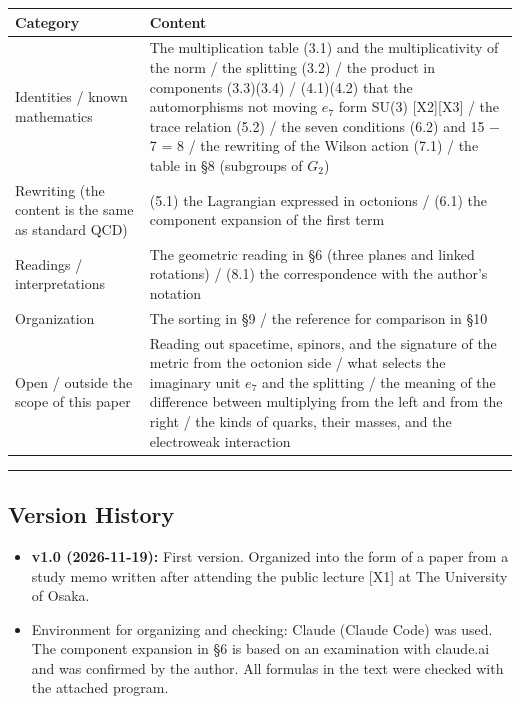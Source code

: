 \documentclass[
  a4paper,
]{article}
\newcounter{none} %
\providecommand{\tightlist}{%
  \setlength{\itemsep}{0pt}\setlength{\parskip}{0pt}}
\begin{document}
{\def\LTcaptype{none} %
\begin{longtable}[]{@{}
  >{\raggedright\arraybackslash}p{}
  >{\raggedright\arraybackslash}p{}@{}}
\toprule\noalign{}
\begin{minipage}[b]{\linewidth}\raggedright
Category
\end{minipage} & \begin{minipage}[b]{\linewidth}\raggedright
Content
\end{minipage} \\
\midrule\noalign{}
\endhead
\bottomrule\noalign{}
\endlastfoot
Identities / known mathematics & The multiplication table (3.1) and the
multiplicativity of the norm / the splitting (3.2) / the product in
components (3.3)(3.4) / (4.1)(4.2) that the automorphisms not moving
\(e_7\) form SU(3) {[}X2{]}{[}X3{]} / the trace relation (5.2) / the
seven conditions (6.2) and 15 − 7 = 8 / the rewriting of the Wilson
action (7.1) / the table in §8 (subgroups of \(G_2\)) \\
Rewriting (the content is the same as standard QCD) & (5.1) the
Lagrangian expressed in octonions / (6.1) the component expansion of the
first term \\
Readings / interpretations & The geometric reading in §6 (three planes
and linked rotations) / (8.1) the correspondence with the author's
notation \\
Organization & The sorting in §9 / the reference for comparison in
§10 \\
Open / outside the scope of this paper & Reading out spacetime, spinors,
and the signature of the metric from the octonion side / what selects
the imaginary unit \(e_7\) and the splitting / the meaning of the
difference between multiplying from the left and from the right / the
kinds of quarks, their masses, and the electroweak interaction \\
\end{longtable}
}

\begin{center}\rule{0.5\linewidth}{0.5pt}\end{center}

\subsection{Version History}\label{version-history}

\begin{itemize}
\tightlist
\item
  \textbf{v1.0 (2026-11-19):} First version. Organized into the form of
  a paper from a study memo written after attending the public lecture
  {[}X1{]} at The University of Osaka.
\item
  Environment for organizing and checking: Claude (Claude Code) was
  used. The component expansion in §6 is based on an examination with
  claude.ai and was confirmed by the author. All formulas in the text
  were checked with the attached program.
\end{itemize}
\end{document}
